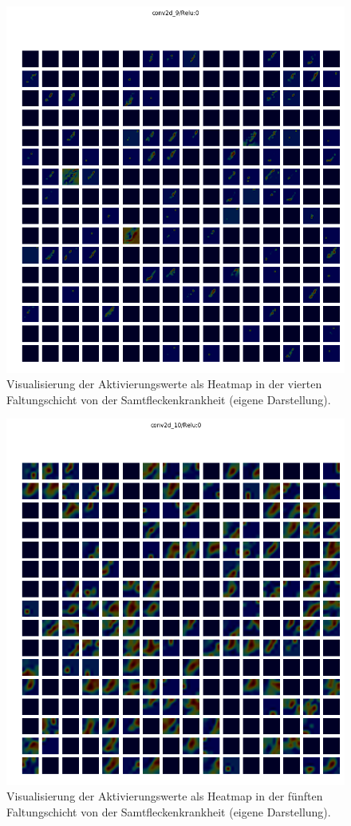 \begin{figure}[h!]
	\centering
	\includegraphics[width=\textwidth]{visualisierungen/leaf_mold/heatmap_mit/conv2d_9.png}
	\caption{Visualisierung der Aktivierungswerte als Heatmap in der vierten Faltungschicht von der Samtfleckenkrankheit (eigene Darstellung).}
	\label{}
\end{figure}

\begin{figure}[h!]
	\centering
	\includegraphics[width=\textwidth]{visualisierungen/leaf_mold/heatmap_mit/conv2d_10.png}
	\caption{Visualisierung der Aktivierungswerte als Heatmap in der fünften Faltungschicht von der Samtfleckenkrankheit (eigene Darstellung).}
	\label{}
\end{figure}
